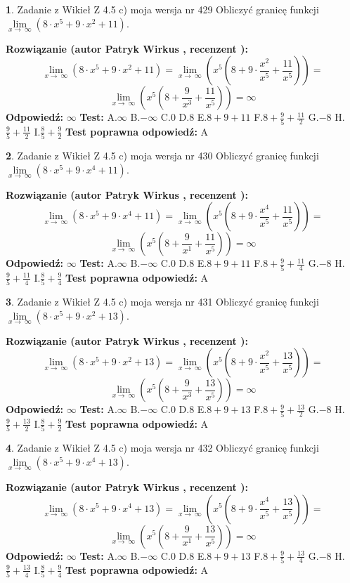 \documentclass[12pt, a4paper]{article}
\theoremstyle{definition} %
\newtheorem{zad}{}
\newcommand{\zadStart}[1]{\begin{zad}#1\newline}
\newcommand{\zadStop}{\end{zad}}
\newcommand{\rozwStart}[2]{\noindent \textbf{Rozwiązanie (autor #1 , recenzent #2): }\newline}
\newcommand{\rozwStop}{\newline}
\newcommand{\odpStart}{\noindent \textbf{Odpowiedź:}\newline}
\newcommand{\odpStop}{\newline}
\newcommand{\testStart}{\noindent \textbf{Test:}\newline}
\newcommand{\testStop}{\newline}
\newcommand{\kluczStart}{\noindent \textbf{Test poprawna odpowiedź:}\newline}
\newcommand{\kluczStop}{\newline}
\begin{document}
\zadStart{Zadanie z Wikieł Z 4.5 c) moja wersja nr 429}
Obliczyć granicę funkcji  $\lim\limits_{x\to\ \infty}(8 \cdot x^{5}+9 \cdot x^{2}+11)$.
\zadStop
\rozwStart{Patryk Wirkus}{}
$$\lim\limits_{x\to\ \infty}(8 \cdot x^{5}+9 \cdot x^{2}+11) = \lim\limits_{x\to\ \infty}(x^{5}(8 +9 \cdot \frac{x^{2}}{x^{5}}+\frac{11}{x^{5}})) =$$ $$\lim\limits_{x\to\ \infty}(x^{5}(8 +\frac{9}{x^{3}}+\frac{11}{x^{5}})) =\infty$$
\rozwStop
\odpStart
$\infty$
\odpStop
\testStart
A.$\infty$ B.$-\infty$ C.$0$ D.$8$ E.$8 + 9 + 11$
F.$8+\frac{9}{5}+\frac{11}{2}$ G.$-8$
H.$\frac{9}{5}+\frac{11}{2}$
I.$\frac{8}{5}+\frac{9}{2}$
\testStop
\kluczStart
A
\kluczStop



\zadStart{Zadanie z Wikieł Z 4.5 c) moja wersja nr 430}
Obliczyć granicę funkcji  $\lim\limits_{x\to\ \infty}(8 \cdot x^{5}+9 \cdot x^{4}+11)$.
\zadStop
\rozwStart{Patryk Wirkus}{}
$$\lim\limits_{x\to\ \infty}(8 \cdot x^{5}+9 \cdot x^{4}+11) = \lim\limits_{x\to\ \infty}(x^{5}(8 +9 \cdot \frac{x^{4}}{x^{5}}+\frac{11}{x^{5}})) =$$ $$\lim\limits_{x\to\ \infty}(x^{5}(8 +\frac{9}{x^{1}}+\frac{11}{x^{5}})) =\infty$$
\rozwStop
\odpStart
$\infty$
\odpStop
\testStart
A.$\infty$ B.$-\infty$ C.$0$ D.$8$ E.$8 + 9 + 11$
F.$8+\frac{9}{5}+\frac{11}{4}$ G.$-8$
H.$\frac{9}{5}+\frac{11}{4}$
I.$\frac{8}{5}+\frac{9}{4}$
\testStop
\kluczStart
A
\kluczStop



\zadStart{Zadanie z Wikieł Z 4.5 c) moja wersja nr 431}
Obliczyć granicę funkcji  $\lim\limits_{x\to\ \infty}(8 \cdot x^{5}+9 \cdot x^{2}+13)$.
\zadStop
\rozwStart{Patryk Wirkus}{}
$$\lim\limits_{x\to\ \infty}(8 \cdot x^{5}+9 \cdot x^{2}+13) = \lim\limits_{x\to\ \infty}(x^{5}(8 +9 \cdot \frac{x^{2}}{x^{5}}+\frac{13}{x^{5}})) =$$ $$\lim\limits_{x\to\ \infty}(x^{5}(8 +\frac{9}{x^{3}}+\frac{13}{x^{5}})) =\infty$$
\rozwStop
\odpStart
$\infty$
\odpStop
\testStart
A.$\infty$ B.$-\infty$ C.$0$ D.$8$ E.$8 + 9 + 13$
F.$8+\frac{9}{5}+\frac{13}{2}$ G.$-8$
H.$\frac{9}{5}+\frac{13}{2}$
I.$\frac{8}{5}+\frac{9}{2}$
\testStop
\kluczStart
A
\kluczStop



\zadStart{Zadanie z Wikieł Z 4.5 c) moja wersja nr 432}
Obliczyć granicę funkcji  $\lim\limits_{x\to\ \infty}(8 \cdot x^{5}+9 \cdot x^{4}+13)$.
\zadStop
\rozwStart{Patryk Wirkus}{}
$$\lim\limits_{x\to\ \infty}(8 \cdot x^{5}+9 \cdot x^{4}+13) = \lim\limits_{x\to\ \infty}(x^{5}(8 +9 \cdot \frac{x^{4}}{x^{5}}+\frac{13}{x^{5}})) =$$ $$\lim\limits_{x\to\ \infty}(x^{5}(8 +\frac{9}{x^{1}}+\frac{13}{x^{5}})) =\infty$$
\rozwStop
\odpStart
$\infty$
\odpStop
\testStart
A.$\infty$ B.$-\infty$ C.$0$ D.$8$ E.$8 + 9 + 13$
F.$8+\frac{9}{5}+\frac{13}{4}$ G.$-8$
H.$\frac{9}{5}+\frac{13}{4}$
I.$\frac{8}{5}+\frac{9}{4}$
\testStop
\kluczStart
A
\kluczStop
\end{document}
